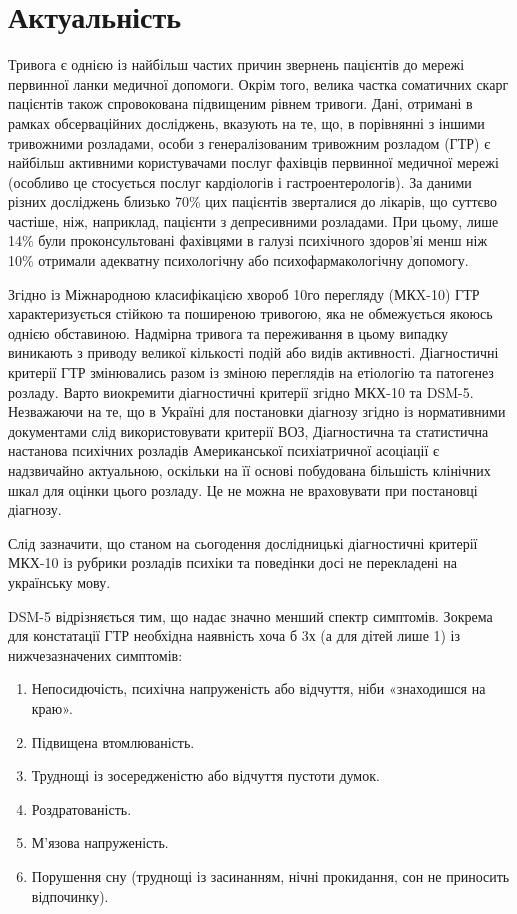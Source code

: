 \documentclass[twocolumn]{article}
\begin{document}
\section{Актуальність}
\par Тривога є однією із найбільш частих причин звернень пацієнтів до мережі первинної ланки медичної допомоги. Окрім того, велика частка соматичних скарг пацієнтів також спровокована підвищеним рівнем тривоги\cite{bib1}. Дані, отримані в рамках обсерваційних досліджень, вказують на те, що, в порівнянні з іншими тривожними розладами, особи з генералізованим тривожним розладом (ГТР) є найбільш активними користувачами послуг фахівців первинної медичної мережі (особливо це стосується послуг кардіологів і гастроентерологів). За даними різних досліджень близько 70\% цих пацієнтів зверталися до лікарів\cite{bib2}, що суттєво частіше, ніж, наприклад, пацієнти з депресивними розладами\cite{bib3}. При цьому, лише 14\% були проконсультовані фахівцями в галузі психічного здоров'я\cite{bib4}і менш ніж 10\% отримали адекватну психологічну або психофармакологічну допомогу\cite{bib3}.
\par Згідно із Міжнародною класифікацією хвороб 10го перегляду (МКX-10) ГТР характеризується стійкою та поширеною тривогою, яка не обмежується якоюсь однією обставиною. Надмірна тривога та переживання в цьому випадку виникають з приводу великої кількості подій або видів активності. Діагностичні критерії ГТР змінювались разом із зміною переглядів на етіологію та патогенез розладу. Варто виокремити діагностичні критерії згідно МКХ-10 та DSM-5. Незважаючи на те, що в Україні для постановки діагнозу згідно із нормативними документами слід використовувати критерії ВОЗ, Діагностична та статистична настанова психічних розладів Американської психіатричної асоціації є надзвичайно актуальною, оскільки на її основі побудована більшість клінічних шкал для оцінки цього розладу. Це не можна не враховувати при постановці діагнозу.
\par Слід зазначити, що станом на сьогодення дослідницькі діагностичні критерії МКХ-10 із рубрики розладів психіки та поведінки досі не перекладені на українську мову\cite{bib5}.
\par DSM-5 відрізняється тим, що надає значно менший спектр симптомів. Зокрема для констатації ГТР необхідна наявність хоча б 3х (а для дітей лише 1) із нижчезазначених симптомів\cite{bib6}:
\begin{enumerate}
\item Непосидючість, психічна напруженість або відчуття, ніби «знаходишся на краю».
\item Підвищена втомлюваність.
\item Труднощі із зосередженістю або відчуття пустоти думок.
\item Роздратованість.
\item М’язова напруженість.
\item Порушення сну (труднощі із засинанням, нічні прокидання, сон не приносить відпочинку).
\end{enumerate}
\end{document}

